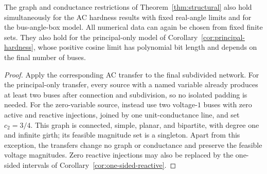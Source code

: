 \begin{corollary}
\label{cor:structural-ac}
The graph and conductance restrictions of Theorem~\ref{thm:structural}
also hold simultaneously for the AC hardness results with fixed real-angle
limits and for the bus-angle-box model. All numerical data can again be
chosen from fixed finite sets. They also hold for the principal-only model
of Corollary~\ref{cor:principal-hardness}, whose positive cosine limit has
polynomial bit length and depends on the final number of buses.
\end{corollary}
\begin{proof}
Apply the corresponding AC transfer to the final subdivided network.
For the principal-only transfer, every source with a named variable already
produces at least two buses after connection and subdivision, so no isolated
padding is needed. For the zero-variable source, instead use two voltage-$1$
buses with zero active and reactive injections, joined by one unit-conductance
line, and set $c_2=3/4$. This graph is connected, simple, planar, and bipartite,
with degree one and infinite girth; its feasible magnitude set is a singleton.
Apart from this exception, the transfers change no graph or conductance and
preserve the feasible voltage magnitudes. Zero reactive injections may also
be replaced by the one-sided intervals of
Corollary~\ref{cor:one-sided-reactive}.
\end{proof}
